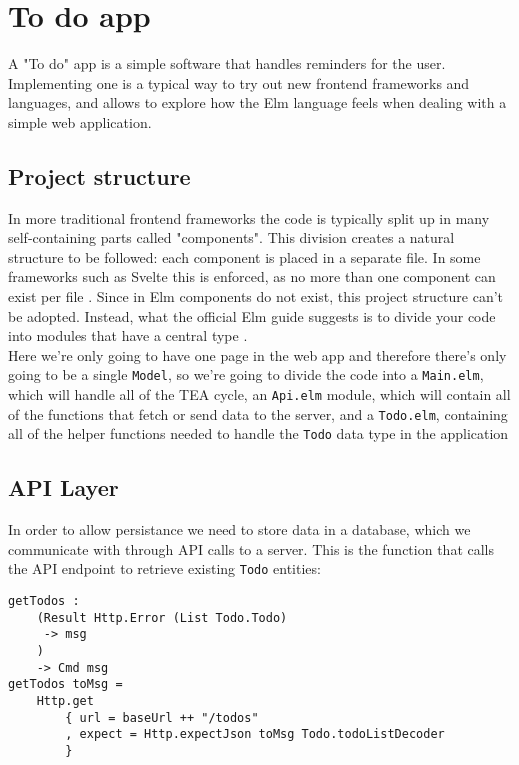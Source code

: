 \section{To do app}

A "To do" app is a simple software that handles reminders for the user. Implementing one is a typical way to try out new frontend frameworks and languages, and allows to explore how the Elm language feels when dealing with a simple web application.

\subsection{Project structure}

In more traditional frontend frameworks the code is typically split up in many self-containing parts called "components". This division creates a natural structure to be followed: each component is placed in a separate file. In some frameworks such as Svelte this is enforced, as no more than one component can exist per file \cite{noauthor_svelte_nodate}. Since in Elm components do not exist, this project structure can't be adopted. Instead, what the official Elm guide suggests is to divide your code into modules that have a central type \cite{noauthor_structure_nodate} .\\

Here we're only going to have one page in the web app and therefore there's only going to be a single \texttt{Model}, so we're going to divide the code into a \texttt{Main.elm}, which will handle all of the TEA cycle, an \texttt{Api.elm} module, which will contain all of the functions that fetch or send data to the server, and a \texttt{Todo.elm}, containing all of the helper functions needed to handle the \texttt{Todo} data type in the application

\subsection{API Layer}

In order to allow persistance we need to store data in a database, which we communicate with through API calls to a server. This is the function that calls the API endpoint to retrieve existing \texttt{Todo} entities:

\begin{verbatim}
getTodos :
    (Result Http.Error (List Todo.Todo)
     -> msg
    )
    -> Cmd msg
getTodos toMsg =
    Http.get
        { url = baseUrl ++ "/todos"
        , expect = Http.expectJson toMsg Todo.todoListDecoder
        }
\end{verbatim}


